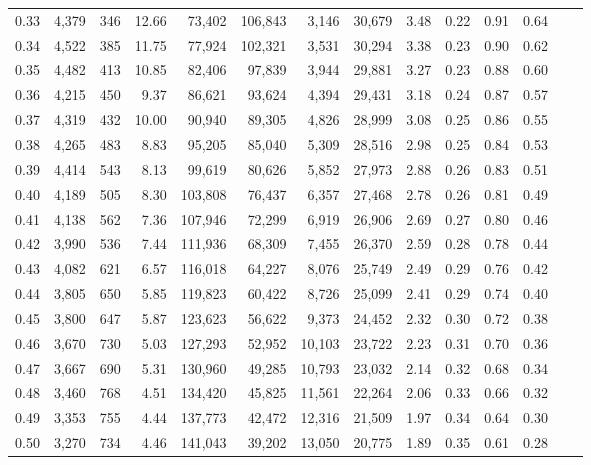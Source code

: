 \begin{tabular}{rrrrrrrrrrrrrr}
0.33 &  4,379 &  346 &   12.66 &   73,402 &  106,843 &   3,146 &  30,679 &  3.48 &  0.22 &  0.91 &      0.64 \\
0.34 &  4,522 &  385 &   11.75 &   77,924 &  102,321 &   3,531 &  30,294 &  3.38 &  0.23 &  0.90 &      0.62 \\
0.35 &  4,482 &  413 &   10.85 &   82,406 &   97,839 &   3,944 &  29,881 &  3.27 &  0.23 &  0.88 &      0.60 \\
0.36 &  4,215 &  450 &    9.37 &   86,621 &   93,624 &   4,394 &  29,431 &  3.18 &  0.24 &  0.87 &      0.57 \\
0.37 &  4,319 &  432 &   10.00 &   90,940 &   89,305 &   4,826 &  28,999 &  3.08 &  0.25 &  0.86 &      0.55 \\
0.38 &  4,265 &  483 &    8.83 &   95,205 &   85,040 &   5,309 &  28,516 &  2.98 &  0.25 &  0.84 &      0.53 \\
0.39 &  4,414 &  543 &    8.13 &   99,619 &   80,626 &   5,852 &  27,973 &  2.88 &  0.26 &  0.83 &      0.51 \\
0.40 &  4,189 &  505 &    8.30 &  103,808 &   76,437 &   6,357 &  27,468 &  2.78 &  0.26 &  0.81 &      0.49 \\
0.41 &  4,138 &  562 &    7.36 &  107,946 &   72,299 &   6,919 &  26,906 &  2.69 &  0.27 &  0.80 &      0.46 \\
0.42 &  3,990 &  536 &    7.44 &  111,936 &   68,309 &   7,455 &  26,370 &  2.59 &  0.28 &  0.78 &      0.44 \\
0.43 &  4,082 &  621 &    6.57 &  116,018 &   64,227 &   8,076 &  25,749 &  2.49 &  0.29 &  0.76 &      0.42 \\
0.44 &  3,805 &  650 &    5.85 &  119,823 &   60,422 &   8,726 &  25,099 &  2.41 &  0.29 &  0.74 &      0.40 \\
0.45 &  3,800 &  647 &    5.87 &  123,623 &   56,622 &   9,373 &  24,452 &  2.32 &  0.30 &  0.72 &      0.38 \\
0.46 &  3,670 &  730 &    5.03 &  127,293 &   52,952 &  10,103 &  23,722 &  2.23 &  0.31 &  0.70 &      0.36 \\
0.47 &  3,667 &  690 &    5.31 &  130,960 &   49,285 &  10,793 &  23,032 &  2.14 &  0.32 &  0.68 &      0.34 \\
0.48 &  3,460 &  768 &    4.51 &  134,420 &   45,825 &  11,561 &  22,264 &  2.06 &  0.33 &  0.66 &      0.32 \\
0.49 &  3,353 &  755 &    4.44 &  137,773 &   42,472 &  12,316 &  21,509 &  1.97 &  0.34 &  0.64 &      0.30 \\
0.50 &  3,270 &  734 &    4.46 &  141,043 &   39,202 &  13,050 &  20,775 &  1.89 &  0.35 &  0.61 &      0.28 \\

\end{tabular}
